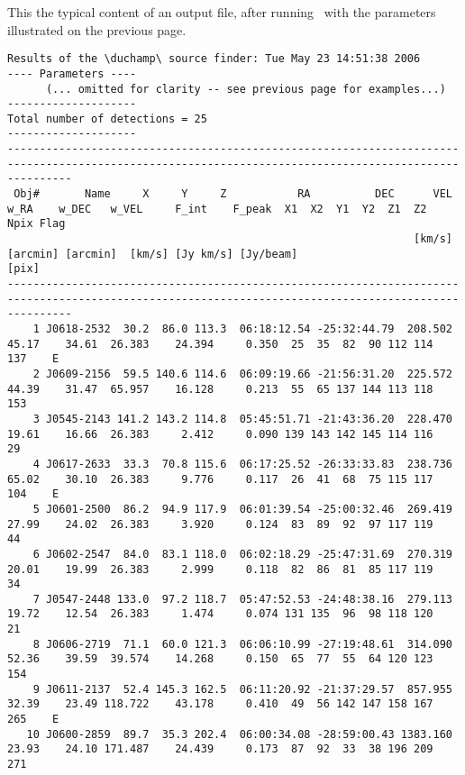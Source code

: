 \label{app-output}
This the typical content of an output file, after running \duchamp\
with the parameters illustrated on the previous page. 

{\scriptsize 
  \begin{verbatim}
Results of the \duchamp\ source finder: Tue May 23 14:51:38 2006
---- Parameters ----
      (... omitted for clarity -- see previous page for examples...)
--------------------
Total number of detections = 25
--------------------
------------------------------------------------------------------------------------------------------------------------------------------------------
 Obj#       Name     X     Y     Z           RA          DEC      VEL     w_RA    w_DEC   w_VEL     F_int    F_peak  X1  X2  Y1  Y2  Z1  Z2  Npix Flag
                                                               [km/s] [arcmin] [arcmin]  [km/s] [Jy km/s] [Jy/beam]                         [pix]     
------------------------------------------------------------------------------------------------------------------------------------------------------
    1 J0618-2532  30.2  86.0 113.3  06:18:12.54 -25:32:44.79  208.502    45.17    34.61  26.383    24.394     0.350  25  35  82  90 112 114   137    E
    2 J0609-2156  59.5 140.6 114.6  06:09:19.66 -21:56:31.20  225.572    44.39    31.47  65.957    16.128     0.213  55  65 137 144 113 118   153     
    3 J0545-2143 141.2 143.2 114.8  05:45:51.71 -21:43:36.20  228.470    19.61    16.66  26.383     2.412     0.090 139 143 142 145 114 116    29     
    4 J0617-2633  33.3  70.8 115.6  06:17:25.52 -26:33:33.83  238.736    65.02    30.10  26.383     9.776     0.117  26  41  68  75 115 117   104    E
    5 J0601-2500  86.2  94.9 117.9  06:01:39.54 -25:00:32.46  269.419    27.99    24.02  26.383     3.920     0.124  83  89  92  97 117 119    44     
    6 J0602-2547  84.0  83.1 118.0  06:02:18.29 -25:47:31.69  270.319    20.01    19.99  26.383     2.999     0.118  82  86  81  85 117 119    34     
    7 J0547-2448 133.0  97.2 118.7  05:47:52.53 -24:48:38.16  279.113    19.72    12.54  26.383     1.474     0.074 131 135  96  98 118 120    21     
    8 J0606-2719  71.1  60.0 121.3  06:06:10.99 -27:19:48.61  314.090    52.36    39.59  39.574    14.268     0.150  65  77  55  64 120 123   154     
    9 J0611-2137  52.4 145.3 162.5  06:11:20.92 -21:37:29.57  857.955    32.39    23.49 118.722    43.178     0.410  49  56 142 147 158 167   265    E
   10 J0600-2859  89.7  35.3 202.4  06:00:34.08 -28:59:00.43 1383.160    23.93    24.10 171.487    24.439     0.173  87  92  33  38 196 209   271     

\end{verbatim}}
